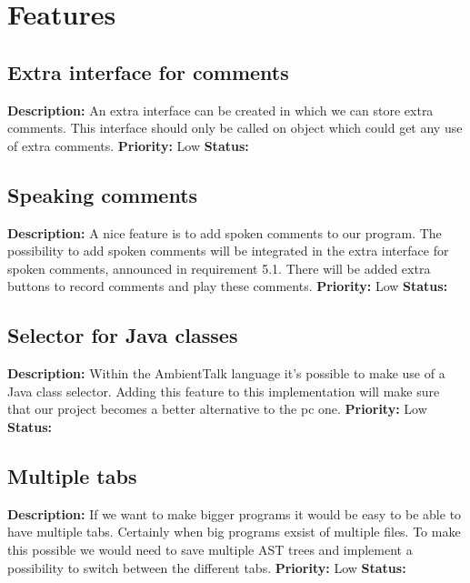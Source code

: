 \documentclass[a4paper,12pt]{report}
\begin{document}
\section{Features}
\subsection{Extra interface for comments}
\textbf{Description: } An extra interface can be created in which we can store extra comments. This interface should only be called on object which could get any use of extra comments.
 \newline
\textbf{Priority:} Low \newline
\textbf{Status: } \newline
\subsection{Speaking comments}
\textbf{Description: } A nice feature is to add spoken comments to our program. The possibility to add spoken comments will be integrated in the
extra interface for spoken comments, announced in requirement 5.1. There will be added extra buttons to record comments and play these comments.\newline
\textbf{Priority:} Low \newline
\textbf{Status: } \newline
\subsection{Selector for Java classes}
\textbf{Description: } Within the AmbientTalk language it's possible to make use of a Java class selector. Adding this feature to this implementation
will make sure that our project becomes a better alternative to the pc one.\newline
\textbf{Priority:} Low \newline
\textbf{Status: } \newline
\subsection{Multiple tabs}
\textbf{Description: } If we want to make bigger programs it would be easy to be able to have multiple tabs. Certainly when big programs exsist of multiple files. To make this possible we would need
to save multiple AST trees and implement a possibility to switch between the different tabs.\newline
\textbf{Priority:} Low \newline
\textbf{Status: }
\end{document}
